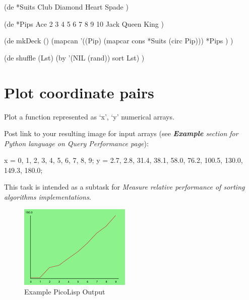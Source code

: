 \begin{wideverbatim}

(de *Suits
   Club Diamond Heart Spade )

(de *Pips
   Ace 2 3 4 5 6 7 8 9 10 Jack Queen King )

(de mkDeck ()
   (mapcan
      '((Pip) (mapcar cons *Suits (circ Pip)))
      *Pips ) )

(de shuffle (Lst)
   (by '(NIL (rand)) sort Lst) )

\end{wideverbatim}

\pagebreak{}
\section*{Plot coordinate pairs}

Plot a function represented as `x', `y' numerical arrays.

Post link to your resulting image for input arrays (see
\emph{\textbf{Example} section for Python
language on \emph{Query Performance} page}):

\begin{wideverbatim}
x = {0, 1, 2, 3, 4, 5, 6, 7, 8, 9};
y = {2.7, 2.8, 31.4, 38.1, 58.0, 76.2, 100.5, 130.0, 149.3, 180.0};
\end{wideverbatim}

This task is intended as a subtask for \emph{Measure relative
  performance of sorting algorithms implementations}.

\begin{figure}[H]
  \centering
  \includegraphics[scale=.6]{graphics/200px-Plotxy-picoLisp.png}
  \caption{Example PicoLisp Output}
  \label{fig:plotxy-picolisp}
\end{figure}


